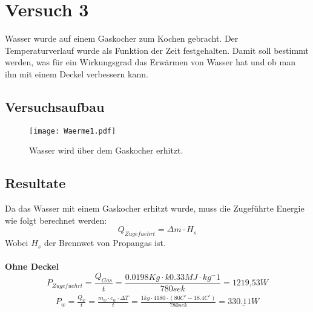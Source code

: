 \documentclass{article}
\begin{document}
\section{Versuch 3}
Wasser wurde auf einem Gaskocher zum Kochen gebracht. Der 
Temperaturverlauf wurde als Funktion der Zeit festgehalten. Damit soll bestimmt werden, was für ein 
Wirkungsgrad das Erwärmen von Wasser hat und ob man ihn mit einem Deckel verbessern kann.  
\subsection{Versuchsaufbau}
\begin{figure}[H]
\begin{center}
\texttt{[image: Waerme1.pdf]} 
\caption{Wasser wird über dem Gaskocher erhitzt.}
\end{center}
\end{figure}
\subsection{Resultate}
Da das Wasser mit einem Gaskocher erhitzt wurde, muss die Zugeführte Energie wie folgt berechnet werden:
\begin{equation}
 Q_{Zugefuehrt} = \Delta m \cdot H_s
\end{equation}
Wobei $H_s$ der Brennwet von Propangas ist.\\\\
\textbf{Ohne Deckel}
\begin{equation}
P_{Zugefuehrt} = \frac{Q_{Gas}}{t} = \frac{0.0198Kg\cdot k0.33MJ \cdot kg^-1}{780sek} = \underline{1219.53 W }
\end{equation}
\begin{align}
\begin{split}
P_{w} = \frac{Q_w}{t} = \frac{m_{w} \cdot c_{w} \cdot \Delta T}{t}=  \frac{1kg \cdot 4180 \cdot (80C^\circ-18.4C^\circ)}{780sek} = \underline{330.11W}
\end{split}
\end{align}
\end{document}
